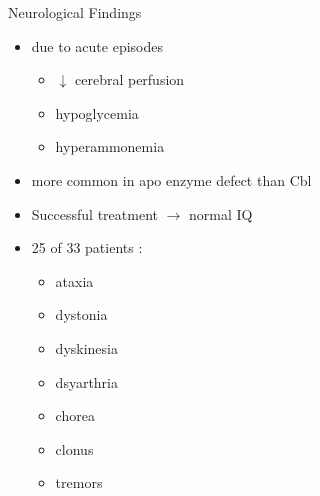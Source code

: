 \documentclass[presentation, smaller]{beamer}
\begin{document}
\begin{frame}[label={sec:orgheadline22}]{Neurological Findings}
\begin{itemize}
\item due to acute episodes
\begin{itemize}
\item \(\downarrow\) cerebral perfusion
\item hypoglycemia
\item hyperammonemia
\end{itemize}
\item more common in apo enzyme defect than Cbl

\item Successful treatment \(\to\) normal IQ
\item 25 of 33 patients :
\begin{itemize}
\item ataxia
\item dystonia
\item dyskinesia
\item dsyarthria
\item chorea
\item clonus
\item tremors
\end{itemize}
\end{itemize}
\end{frame}
\end{document}

